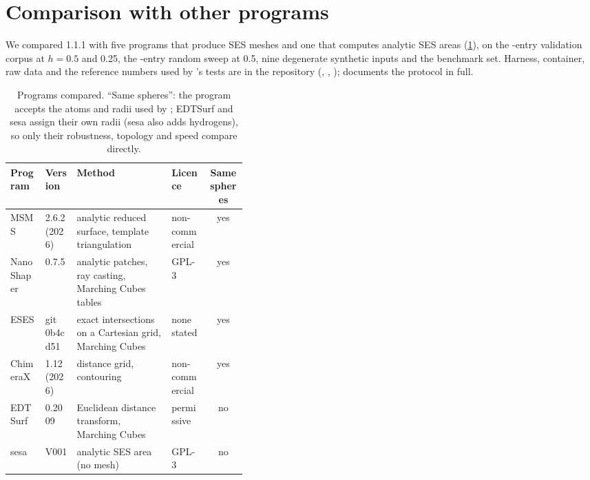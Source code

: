 
\section{Comparison with other programs}
\label{sec:comparison}

We compared \sesmesh{} 1.1.1 with five programs that produce SES meshes and
one that computes analytic SES areas (\cref{tab:cmp-programs}), on the
-entry validation corpus at $h = 0.5$ and 0.25\Ang, the
-entry random sweep at 0.5\Ang, nine degenerate synthetic
inputs and the benchmark set. Harness, container, raw data and the reference
numbers used by \sesmesh's tests are in the repository (,
, );
 documents the protocol in full.

\begin{table}[t]
  \centering
  \caption{Programs compared. ``Same spheres'': the program accepts the
    atoms and radii used by \sesmesh{}; EDTSurf and sesa assign their own
    radii (sesa also adds hydrogens), so only their robustness, topology and
    speed compare directly.}
  \label{tab:cmp-programs}
  \footnotesize
  \setlength{\tabcolsep}{4pt}
  \begin{tabular}{@{}llp{0.40\linewidth}lc@{}}
    \toprule
    Program & Version & Method & Licence & Same spheres \\
    \midrule
    MSMS~\cite{sanner1996} & 2.6.2 (2026) & analytic reduced surface, template triangulation & non-commercial & yes \\
    NanoShaper~\cite{decherchi2013} & 0.7.5 & analytic patches, ray casting, Marching Cubes tables & GPL-3 & yes \\
    ESES~\cite{liu2017eses} & git 0b4cd51 & exact intersections on a Cartesian grid, Marching Cubes & none stated & yes \\
    ChimeraX~\cite{chimeraxsurface} & 1.12 (2026) & distance grid, contouring & non-commercial & yes \\
    EDTSurf~\cite{xu2009edtsurf} & 0.2009 & Euclidean distance transform, Marching Cubes & permissive & no \\
    sesa~\cite{wang2024sesa} & V001 & analytic SES area (no mesh) & GPL-3 & no \\
    \bottomrule
  \end{tabular}
\end{table}

